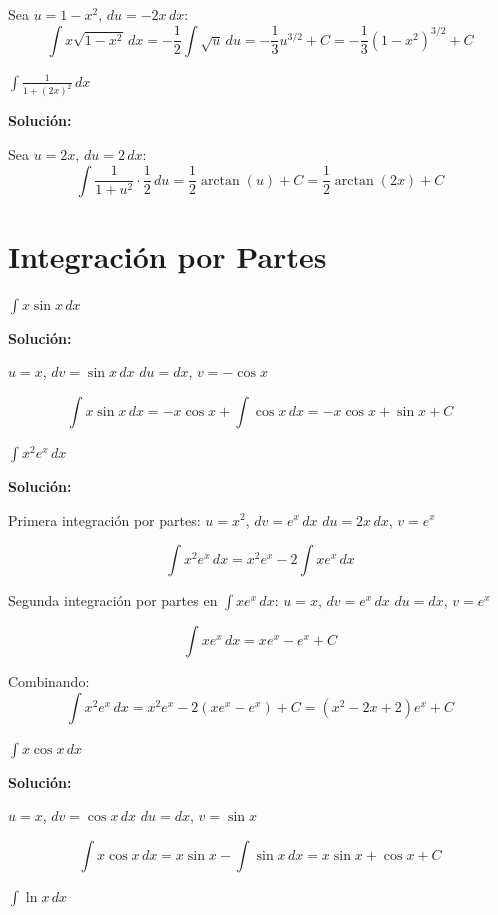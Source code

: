 \documentclass[12pt, a4paper]{book}
\begin{document}
Sea $u = 1-x^2$, $du = -2x \, dx$:
\[
\int x\sqrt{1-x^2} \, dx = -\frac{1}{2}\int \sqrt{u} \, du = -\frac{1}{3}u^{3/2} + C = -\frac{1}{3}(1-x^2)^{3/2} + C
\]

\begin{ejercicio}
$\int \frac{1}{1+(2x)^2} \, dx$
\end{ejercicio}

\textbf{Solución:}

Sea $u = 2x$, $du = 2 \, dx$:
\[
\int \frac{1}{1+u^2} \cdot \frac{1}{2} \, du = \frac{1}{2}\arctan(u) + C = \frac{1}{2}\arctan(2x) + C
\]

\section{Integración por Partes}

\begin{ejercicio}
$\int x\sin x \, dx$
\end{ejercicio}

\textbf{Solución:}

$u = x$, $dv = \sin x \, dx$
$du = dx$, $v = -\cos x$

\[
\int x\sin x \, dx = -x\cos x + \int \cos x \, dx = -x\cos x + \sin x + C
\]

\begin{ejercicio}
$\int x^2 e^x \, dx$
\end{ejercicio}

\textbf{Solución:}

Primera integración por partes:
$u = x^2$, $dv = e^x \, dx$
$du = 2x \, dx$, $v = e^x$

\[
\int x^2 e^x \, dx = x^2 e^x - 2\int x e^x \, dx
\]

Segunda integración por partes en $\int x e^x \, dx$:
$u = x$, $dv = e^x \, dx$
$du = dx$, $v = e^x$

\[
\int x e^x \, dx = xe^x - e^x + C
\]

Combinando:
\[
\int x^2 e^x \, dx = x^2 e^x - 2(xe^x - e^x) + C = (x^2 - 2x + 2)e^x + C
\]

\begin{ejercicio}
$\int x\cos x \, dx$
\end{ejercicio}

\textbf{Solución:}

$u = x$, $dv = \cos x \, dx$
$du = dx$, $v = \sin x$

\[
\int x\cos x \, dx = x\sin x - \int \sin x \, dx = x\sin x + \cos x + C
\]

\begin{ejercicio}
$\int \ln x \, dx$
\end{ejercicio}
\end{document}
